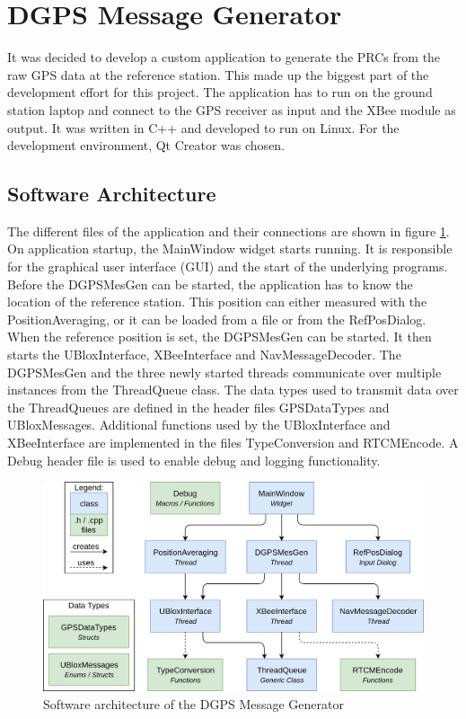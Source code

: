 \section{DGPS Message Generator}\label{sec:dgps_message_generator}

It was decided to develop a custom application to generate the PRCs from the raw GPS data at the reference station.
This made up the biggest part of the development effort for this project.
The application has to run on the ground station laptop and connect to the GPS receiver as input and the XBee module as output.
It was written in C++ and developed to run on Linux.
For the development environment, Qt Creator was chosen.

\newpage

\subsection{Software Architecture}

The different files of the application and their connections are shown in figure \ref{fig:software_architecture}.
On application startup, the MainWindow widget starts running.
It is responsible for the graphical user interface (GUI) and the start of the underlying programs.
Before the DGPSMesGen can be started, the application has to know the location of the reference station.
This position can either measured with the PositionAveraging, or it can be loaded from a file or from the RefPosDialog.
When the reference position is set, the DGPSMesGen can be started.
It then starts the UBloxInterface, XBeeInterface and NavMessageDecoder.
The DGPSMesGen and the three newly started threads communicate over multiple instances from the ThreadQueue class.
The data types used to transmit data over the ThreadQueues are defined in the header files GPSDataTypes and UBloxMessages.
Additional functions used by the UBloxInterface and XBeeInterface are implemented in the files TypeConversion and RTCMEncode.
A Debug header file is used to enable debug and logging functionality.

\begin{figure}[ht]
 \centering
 \includegraphics[width=\textwidth]{images/Software_Architecture.png}
 \caption{Software architecture of the DGPS Message Generator}
 \label{fig:software_architecture}
\end{figure}

